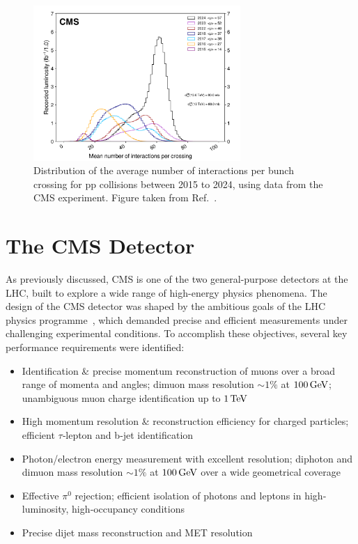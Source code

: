 \begin{figure}[h]
\centering
\includegraphics[width= 0.7\textwidth]{Figures/Chapter3/CMS_Pileup.pdf}
\caption{Distribution of the average number of interactions per bunch crossing for pp collisions between 2015 to 2024, using data from the CMS experiment. Figure taken from Ref.~\cite{CMS_IntegratedLumi}.}
\label{Figure:Chapter3_CMS_Pileup}
\end{figure}

\section{The CMS Detector}
\label{Section:Chapter3_CMS_Detector_Introduction}
As previously discussed, CMS is one of the two general-purpose detectors at the LHC, built to explore a wide range of high-energy physics phenomena. The design of the CMS detector was shaped by the ambitious goals of the LHC physics programme~\cite{LHC_CMS}, which demanded precise and efficient measurements under challenging experimental conditions. To accomplish these objectives, several key performance requirements were identified:

\begin{itemize}
  \item Identification \& precise momentum reconstruction of muons over a broad range of momenta and angles; dimuon mass resolution $\sim1\%$ at $100\,\text{Ge\hspace{-.08em}V}$; unambiguous muon charge identification up to $1\,\text{Te\hspace{-.08em}V}$
  \item High momentum resolution \& reconstruction efficiency for charged particles; efficient $\tau$‐lepton and b‐jet identification
  \item Photon/electron energy measurement with excellent resolution; diphoton and dimuon mass resolution $\sim1\%$ at $100\,\text{Ge\hspace{-.08em}V}$ over a wide geometrical coverage
  \item Effective $\pi^0$ rejection; efficient isolation of photons and leptons in high‐luminosity, high‐occupancy conditions
  \item Precise dijet mass reconstruction and MET resolution
\end{itemize}

